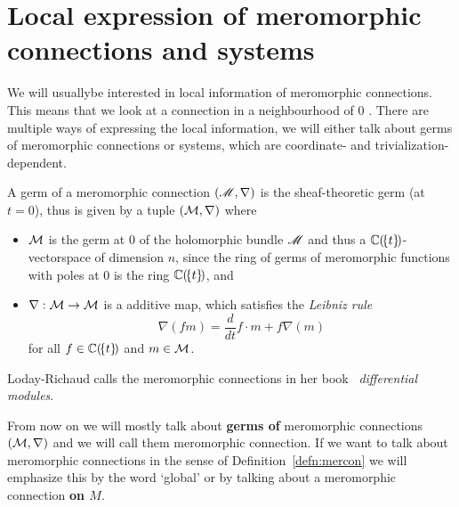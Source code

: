 \section{Local expression of meromorphic connections and systems}
We will usually\TODO[only?] be interested in local information of meromorphic
connections.  This means that we look at a connection in a neighbourhood of $0$
.
There are multiple ways of expressing the local information, we will either
talk about germs of meromorphic connections or systems, which are coordinate-
and trivialization-dependent.
\begin{prop}
  A germ of a meromorphic connection $(\mathscr{M},\nabla)$ is the sheaf-theoretic
  germ (at $t=0$), thus is given by a tuple $(\mathcal{M},\nabla)$ where
  \begin{itemize}
    \item $\mathcal{M}$ is the germ at $0$ of the holomorphic bundle $\mathscr{M}$ and thus a
      $\mathbb{C}(\!\{t\}\!)$-vectorspace of dimension $n$, since the ring of germs of
      meromorphic functions with poles at $0$ is the ring $\mathbb{C}(\!\{t\}\!)$, and
    \item $\nabla:\mathcal{M}\to \mathcal{M}$ is a additive map, which
      satisfies the \emph{Leibniz rule}
      \[
        \nabla(fm)=\frac{d}{dt} f\cdot m + f\nabla(m)
      \]
      for all $f\in\mathbb{C}(\!\{t\}\!)$ and $m\in \mathcal{M}$.
  \end{itemize}
  \begin{comment}
      \begin{s-rem}
      \marginnote{\cite{sabbah2007isomonodromic}}
      It is a $(\C(\!\{t\}\!),\nabla)$-vectorspace.
    \end{s-rem}
  \end{comment}
  \begin{s-rem}
    Loday-Richaud calls the meromorphic connections in her
    book~\cite[Def.4.2.1]{Loday2014} \emph{differential modules}.
  \end{s-rem}
\end{prop}
\begin{rem}\label{rem:GlobalNothingGerm}
  From now on we will mostly talk about \textbf{germs of} meromorphic
  connections $(\mathcal{M},\nabla)$ and we will call them meromorphic connection. If
  we want to talk about meromorphic connections in the sense of
  Definition~\ref{defn:mercon} we will emphasize this by the word `global' or
  by talking about a meromorphic connection \textbf{on $M$}.
\end{rem}
